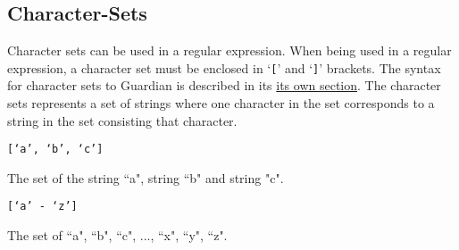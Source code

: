 
\subsection{Character-Sets}
{
	Character sets can be used in a regular expression.
	When being used in a regular expression, a character set must be enclosed in
	`\texttt{[}' and `\texttt{]}' brackets.
	The syntax for character sets to Guardian is described in its
	\hyperref[sec:charset]{its own section}.
	The character sets represents a set of strings where one character
	in the set corresponds to a string in the set consisting that character.
	
	\begin{itemize}
	{
		\item \texttt{[`a', `b', `c']}
		
			The set of the string ``a", string
			``b" and string "c".
		
		\item \texttt{[`a' - `z']}
		
			The set of ``a", ``b", ``c", ..., ``x", ``y", ``z".
	}
	\end{itemize}
	
}
